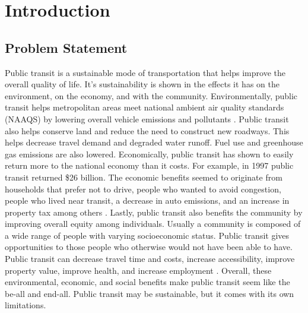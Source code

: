 \documentclass[3p, authoryear, review]{elsarticle} %
\begin{document}
\hypertarget{introduction}{%
\section{Introduction}\label{introduction}}

\hypertarget{problem-statement}{%
\subsection{Problem Statement}\label{problem-statement}}

Public transit is a sustainable mode of transportation that helps improve the overall quality of life. It's sustainability is shown in the effects it has on the environment, on the economy, and with the community. Environmentally, public transit helps metropolitan areas meet national ambient air quality standards (NAAQS) by lowering overall vehicle emissions and pollutants \citep{fta22}. Public transit also helps conserve land and reduce the need to construct new roadways. This helps decrease travel demand and degraded water runoff. Fuel use and greenhouse gas emissions are also lowered. Economically, public transit has shown to easily return more to the national economy than it costs. For example, in 1997 public transit returned \$26 billion. The economic benefits seemed to originate from households that prefer not to drive, people who wanted to avoid congestion, people who lived near transit, a decrease in auto emissions, and an increase in property tax among others \citep{fta15}. Lastly, public transit also benefits the community by improving overall equity among individuals. Usually a community is composed of a wide range of people with varying socioeconomic status. Public transit gives opportunities to those people who otherwise would not have been able to have. Public transit can decrease travel time and costs, increase accessibility, improve property value, improve health, and increase employment \citep{venter18}. Overall, these environmental, economic, and social benefits make public transit seem like the be-all and end-all. Public transit may be sustainable, but it comes with its own limitations.
\end{document}
